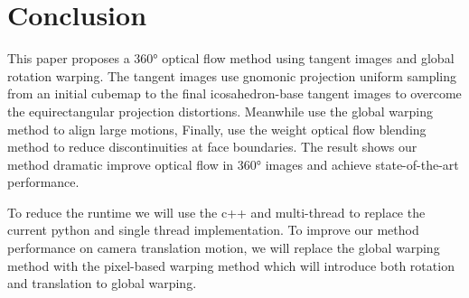 \section{Conclusion}

This paper proposes a 360° optical flow method using tangent images and global rotation warping.
The tangent images use gnomonic projection uniform sampling from an initial cubemap to the final icosahedron-base tangent images to overcome the equirectangular projection distortions. Meanwhile use the global warping method to align large motions, 
Finally, use the weight optical flow blending method to reduce discontinuities at face boundaries.
%
The result shows our method dramatic improve optical flow in 360° images and achieve state-of-the-art performance.

To reduce the runtime we will use the c++ and multi-thread to replace the current python and single thread implementation.
To improve our method performance on camera translation motion, we will replace the global warping method with the pixel-based warping method which will introduce both rotation and translation to global warping.